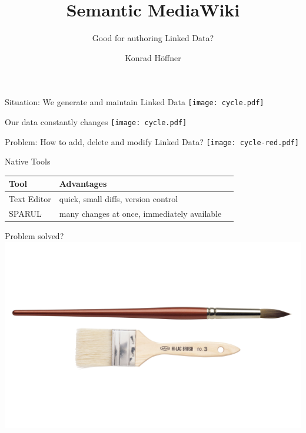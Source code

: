 \documentclass{beamer}
\title{Semantic MediaWiki}
\subtitle{Good for authoring Linked Data?}
\author{Konrad Höffner}
\begin{document}
\begin{frame}
\titlepage
\end{frame}

\begin{frame}{Situation: We generate and maintain Linked Data}
\centering
\texttt{[image: cycle.pdf]}
\end{frame}

\begin{frame}{Our data constantly changes}
\centering
\texttt{[image: cycle.pdf]}
\end{frame}

\begin{frame}{Problem: How to add, delete and modify Linked Data?}
\centering
\texttt{[image: cycle-red.pdf]}
\end{frame}

\begin{frame}{Native Tools}
\centering
\begin{tabulary}{\textwidth}{lLL}
\toprule
Tool		&Advantages\\					
\midrule
Text Editor	&quick, small diffs, version control\\
SPARUL		&many changes at once, immediately available\\
\bottomrule
\end{tabulary}
\end{frame}

\begin{frame}{Problem solved?}
\centering
\includegraphics[width=\textwidth]{img/texteditorsparul.png}
\end{frame}
\end{document}
